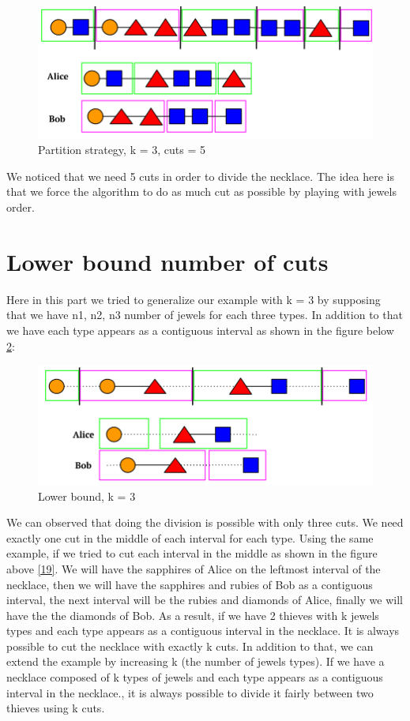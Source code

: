 \documentclass[a4paper,10pt]{article}
\begin{document}
\begin{figure}[H]
  \centering
\includegraphics[scale=.38]{k = 3, cuts = 5.png}
\caption{Partition strategy, k = 3, cuts = 5}
\label{8}
\end{figure}
We noticed that we need 5 cuts in order to divide the necklace. The idea here is that we force the algorithm to do as much cut as possible by playing with jewels order.




\section{Lower bound number of cuts}
Here in this part we tried to generalize our example with k = 3 by supposing that we have n1, n2, n3 number of jewels for each three types. In addition to that we have each type appears as a contiguous interval as shown in the figure below \ref{9}:

\begin{figure}[H]
  \centering
\includegraphics[scale=.38]{generalize_Partition_Strategy.png}
\caption{Lower bound, k = 3}
\label{9}
\end{figure}
We can observed that doing the division is possible with only three cuts. We need exactly one cut in the middle of each interval for each type. Using the same example, if we tried to cut each interval in the middle as shown in the figure above \ref{19}. We will have the sapphires of Alice on the leftmost interval of the necklace, then we will have the sapphires and rubies of Bob as a contiguous interval, the next interval will be the rubies and diamonds of Alice, finally we will have the the diamonds of Bob. As a result, if we have 2 thieves with k jewels types and each type appears as a contiguous interval in the necklace. It is always possible to cut the necklace with exactly k cuts. 
In addition to that, we can extend the example by increasing k (the number of jewels types). If we have a necklace composed of k types of jewels and each type appears as a contiguous interval in the necklace., it is always possible to divide it fairly between two thieves using k cuts. 
\end{document}
